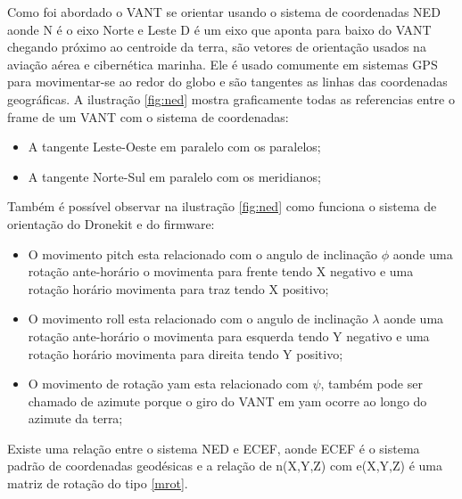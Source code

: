 Como foi abordado o VANT se orientar usando o sistema de coordenadas NED aonde N é o eixo Norte e Leste D é um eixo que aponta para baixo do VANT chegando próximo ao centroide da terra, são vetores de orientação usados na aviação aérea e cibernética marinha. Ele é usado comumente em sistemas GPS para movimentar-se ao redor do globo e são tangentes as linhas das coordenadas geográficas. A ilustração \ref{fig:ned} mostra graficamente todas as referencias entre o frame de um VANT com o sistema de coordenadas:

\begin{itemize}
	\item A tangente Leste-Oeste em paralelo com os paralelos;
	\item A tangente Norte-Sul em paralelo com os meridianos;
\end{itemize}

Também é possível observar na ilustração \ref{fig:ned} como funciona o sistema de orientação do Dronekit e do firmware:

 \begin{itemize}
 	\item O movimento pitch esta relacionado com o angulo de inclinação $\phi$ aonde uma rotação ante-horário o movimenta para frente tendo X negativo e uma rotação horário movimenta para traz tendo X positivo;
 	\item O movimento roll esta relacionado com o angulo de inclinação $\lambda$ aonde uma rotação ante-horário o movimenta para esquerda tendo Y negativo e uma rotação horário movimenta para direita tendo Y positivo;
 	\item O movimento de rotação yam esta relacionado com $\psi$, também pode ser chamado de azimute porque o giro do VANT em yam ocorre ao longo do azimute da terra;
  \end{itemize}	

 Existe uma relação entre o sistema NED e ECEF, aonde ECEF é o sistema padrão de coordenadas geodésicas e a relação de n(X,Y,Z) com e(X,Y,Z) é uma matriz de rotação do tipo \ref{mrot}.
 
